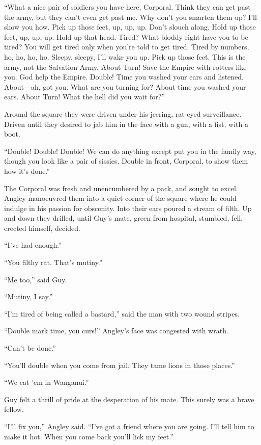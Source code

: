 ``What a nice pair of soldiers you have here, Corporal. Think they can get 
past the army, but they can't even get past me. Why don't you smarten them 
up? I'll show you how. Pick up those feet, up, up, up. Don't slouch along. 
Hold up those feet, up, up, up. Hold up that head. Tired? What bloddy right 
have you to be tired? You will get tired only when you're told to get 
tired. Tired by numbers, ho, ho, ho, ho. Sleepy, sleepy, I'll wake you up. 
Pick up those feet. This is the army, not the Salvation Army. About Turn! 
Save the Empire with rotters like you. God help the Empire. Double! Time 
you washed your ears and listened. About---ah, got you. What are you turning 
for? About time you washed your ears. About Turn! What the hell did you 
wait for?''

Around the square they were driven under his jeering, rat-eyed surveillance. 
Driven until they desired to jab him in the face with a gun, with a fist, 
with a boot.

``Double! Double! Double! We can do anything except put you in the family 
way, though you look like a pair of sissies. Double in front, Corporal, to 
show them how it's done.''

The Corporal was fresh and unencumbered by a pack, and sought to excel. 
Angley manoeuvred them into a quiet corner of the square where he could 
indulge in his passion for obscenity. Into their ears poured a stream of 
filth. Up and down they drilled, until Guy's mate, green from hospital, 
stumbled, fell, erected himself, decided.

``I've had enough.''

``You filthy rat. That's mutiny.''

``Me too,'' said Guy.

``Mutiny, I say.''

``I'm tired of being called a bastard,'' said the man with two wound stripes.

``Double mark time, you curs!'' Angley's face was congested with wrath.

``Can't be done.''

``You'll double when you come from jail. They tame lions in those places.''

``We eat 'em in Wanganui.''

Guy felt a thrill of pride at the desperation of his mate. This surely was 
a brave fellow.

``I'll fix you,'' Angley said. ``I've got a friend where you are going. I'll 
tell him to make it hot. When you come back you'll lick my feet.''

